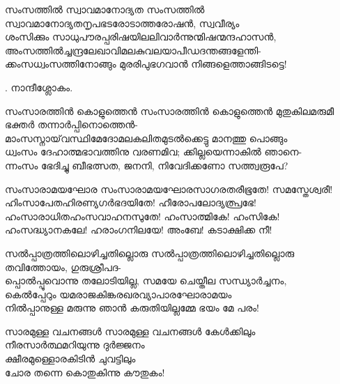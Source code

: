 \begin{enumerate}

\begin{slokam}{\VSr}{\ARRV}{സംസത്തിൽ സ്വാവമാനോദ്യത}
സംസത്തിൽ സ്വാവമാനോദ്യതനൃപഭടരോടാത്തരോഷൻ, സ്വവീര്യം\\
ശംസിക്കും സാധുപൗരപ്പരിഷയിലലിവാർന്നുന്മിഷന്മന്ദഹാസൻ,\\
അംസത്തിൽച്ചന്ദ്രലേഖാവിമലകുവലയാപീഡദന്തങ്ങളേന്തി-\\
ക്കംസധ്വംസത്തിനോങ്ങും മുരരിപുഭഗവാൻ നിങ്ങളെത്താങ്ങിടട്ടെ!
\end{slokam}


.  നാന്ദീശ്ലോകം.


\begin{slokam}{\VSr}{\PCM}{സംസാരത്തിന്‍ കൊളുത്തെന്‍}
സംസാരത്തിന്‍ കൊളുത്തെന്‍ മുതുകിലമരുമീ ഭക്തര്‍ തന്നാര്‍പ്പിനൊത്തെന്‍-\\
മാംസസ്നായ്‌വസ്ഥിമേദോമലകലിതമുടല്‍ക്കെട്ടു മാനത്തു പൊങ്ങും\\
ധ്വംസം ദേഹാത്മഭാവത്തിനു വരണമിവ; ക്കില്ലയെന്നാകില്‍ ഞാനെ-\\
ന്നംസം ഭേദിച്ചു ബീഭത്സത, ജനനി, നിവേദിക്കണോ സത്ത്വരൂപേ?
\end{slokam}



\begin{slokam}{\VSv}{\KA}{സംസാരാമയഘോര}
സംസാരാമയഘോരസാഗരതരീഭൂതേ! സമസ്തേശ്വരീ!\\
ഹിംസാപേതഹിരണ്യഗർഭദയിതേ! ഹീരോപലോദ്യത്പ്രഭേ! \\
ഹംസാരാധിതഹംസവാഹനസുതേ! ഹംസാത്മികേ! ഹംസികേ!\\
ഹംസദ്ധ്യാനകലേ! ഹരാംഗനിലയേ! അംബേ! കടാക്ഷിക്ക നീ!
\end{slokam}


\begin{slokam}{\VSv}{\ONN}{സൽപ്പാത്രത്തിലൊഴിച്ചതില്ലൊരു}
സൽപ്പാത്രത്തിലൊഴിച്ചതില്ലൊരു തവിത്തോയം, ഗുരുശ്രീപദ-\\
പ്പൊൽപ്പൂവൊന്നു തലോടിയില്ല, സമയേ ചെയ്തീല സന്ധ്യാർച്ചനം,\\
കെൽപ്പേറും യമരാജകിങ്കരഖരവ്യാപാരഘോരാമയം\\
നിൽപ്പാനുള്ള മരുന്നു ഞാൻ കരുതിയില്ലമ്മേ ഭയം മേ പരം!
\end{slokam}


\begin{slokam}{\VRt}{\Unk}{സാരമുള്ള വചനങ്ങള്‍}
സാരമുള്ള വചനങ്ങള്‍ കേള്‍ക്കിലും\\
നീരസാർത്ഥമറിയുന്നു ദുർജ്ജനം\\
ക്ഷീരമുള്ളൊരകിടിൻ ചുവട്ടിലും\\
ചോര തന്നെ കൊതുകിന്നു കൗതുകം!
\end{slokam}


\end{enumerate}
